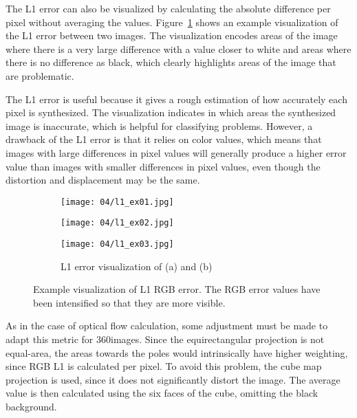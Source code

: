 The L1 error can also be visualized by calculating the absolute difference per pixel without averaging the values. Figure~\ref{fig:l1_example} shows an example visualization of the L1 error between two images. The visualization encodes areas of the image where there is a very large difference with a value closer to white and areas where there is no difference as black, which clearly highlights areas of the image that are problematic.

The L1 error is useful because it gives a rough estimation of how accurately each pixel is synthesized. The visualization indicates in which areas the synthesized image is inaccurate, which is helpful for classifying problems. However, a drawback of the L1 error is that it relies on color values, which means that images with large differences in pixel values will generally produce a higher error value than images with smaller differences in pixel values, even though the distortion and displacement may be the same.

\begin{figure}
\centering
    \hfill
    \begin{subfigure}[t]{0.3\textwidth}
            \centering
            \texttt{[image: 04/l1\_ex01.jpg]}
            \caption{}
    \end{subfigure}%
    \hfill
    \begin{subfigure}[t]{0.3\textwidth}
            \centering
            \texttt{[image: 04/l1\_ex02.jpg]}
            \caption{}
    \end{subfigure}
    \hfill
    \begin{subfigure}[t]{0.3\textwidth}
            \centering
            \texttt{[image: 04/l1\_ex03.jpg]}
            \caption{L1 error visualization of (a) and (b)}
    \end{subfigure}%
    \hfill
    \hfill
  \caption[Example visualization of L1 RGB error]{Example visualization of L1 RGB error. The RGB error values have been intensified so that they are more visible.} \label{fig:l1_example}
\end{figure}

As in the case of optical flow calculation, some adjustment must be made to adapt this metric for 360\degree images. Since the equirectangular projection is not equal-area, the areas towards the poles would intrinsically have higher weighting, since RGB L1 is calculated per pixel. To avoid this problem, the cube map projection is used, since it does not significantly distort the image. The average value is then calculated using the six faces of the cube, omitting the black background.

